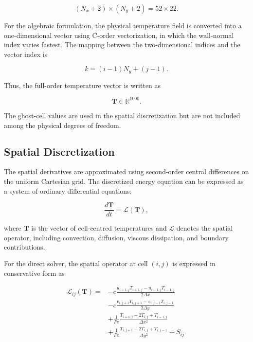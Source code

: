 \begin{equation}
    (N_x+2)\times(N_y+2)=52\times22.
\end{equation}

For the algebraic formulation, the physical temperature field is
converted into a one-dimensional vector using C-order
vectorization, in which the wall-normal index varies fastest.
The mapping between the two-dimensional indices and the vector
index is

\begin{equation}
    k=(i-1)N_y+(j-1).
    \label{eq:vector_indexing}
\end{equation}

Thus, the full-order temperature vector is written as

\begin{equation}
    \mathbf{T}\in\mathbb{R}^{1000}.
\end{equation}

The ghost-cell values are used in the spatial discretization
but are not included among the physical degrees of freedom.


\subsection{Spatial Discretization}

The spatial derivatives are approximated using second-order
central differences on the uniform Cartesian grid. The
discretized energy equation can be expressed as a system of
ordinary differential equations:

\begin{equation}
    \frac{d\mathbf{T}}{dt}
    =
    \mathcal{L}(\mathbf{T}),
    \label{eq:direct_ode}
\end{equation}

where $\mathbf{T}$ is the vector of cell-centred temperatures
and $\mathcal{L}$ denotes the spatial operator, including
convection, diffusion, viscous dissipation, and boundary
contributions.

For the direct solver, the spatial operator at cell $(i,j)$
is expressed in conservative form as

\begin{align}
    \mathcal{L}_{ij}(\mathbf{T})
    ={}&
    -c\frac{
    u_{i+1,j}T_{i+1,j}
    -u_{i-1,j}T_{i-1,j}
    }{2\Delta x}
    \nonumber\\
    &-
    c\frac{
    v_{i,j+1}T_{i,j+1}
    -v_{i,j-1}T_{i,j-1}
    }{2\Delta y}
    \nonumber\\
    &+
    \frac{1}{Pe}
    \frac{
    T_{i+1,j}-2T_{i,j}+T_{i-1,j}
    }{\Delta x^2}
    \nonumber\\
    &+
    \frac{1}{Pe}
    \frac{
    T_{i,j+1}-2T_{i,j}+T_{i,j-1}
    }{\Delta y^2}
    +S_{ij}.
    \label{eq:direct_spatial_operator}
\end{align}

